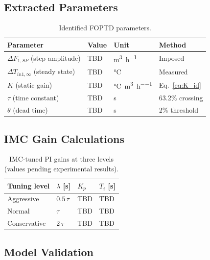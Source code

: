 \subsection{Extracted Parameters}

\begin{table}[H]
  \centering
  \caption{Identified FOPTD parameters.}
  \label{tab:id_results}
  \begin{tabular}{@{}L{5cm}C{3cm}C{2cm}L{3cm}@{}}
    \toprule
    \textbf{Parameter} & \textbf{Value} & \textbf{Unit} & \textbf{Method} \\
    \midrule
    $\Delta F_{1,SP}$ (step amplitude)   & TBD & \si{\metre\cubed\per\hour} & Imposed \\
    $\Delta T_{in1,\infty}$ (steady state)& TBD & \si{\degreeCelsius} & Measured \\
    $K$ (static gain)                    & TBD & \si{\degreeCelsius\per\metre\cubed\per\hour} & Eq.~\eqref{eq:K_id} \\
    $\tau$ (time constant)               & TBD & \si{\second} & 63.2\% crossing \\
    $\theta$ (dead time)                 & TBD & \si{\second} & 2\% threshold \\
    \bottomrule
  \end{tabular}
\end{table}

\subsection{IMC Gain Calculations}

\begin{table}[H]
  \centering
  \caption{IMC-tuned PI gains at three levels (values pending experimental results).}
  \label{tab:imc_results}
  \begin{tabular}{@{}L{3.5cm}C{2.5cm}C{2.5cm}C{2.5cm}@{}}
    \toprule
    \textbf{Tuning level} & \textbf{$\lambda$ [\si{\second}]} &
    \textbf{$K_p$} & \textbf{$T_i$ [\si{\second}]} \\
    \midrule
    Aggressive  & $0.5\,\tau$ & TBD & TBD \\
    Normal      & $\tau$      & TBD & TBD \\
    Conservative& $2\,\tau$   & TBD & TBD \\
    \bottomrule
  \end{tabular}
\end{table}

\subsection{Model Validation}


